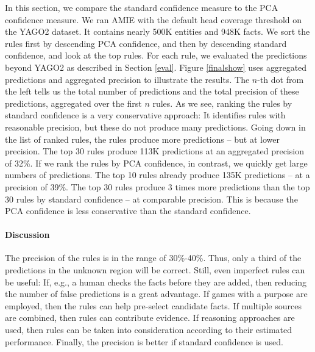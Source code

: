 In this section, we compare the standard confidence measure to the PCA confidence measure. 
We ran AMIE with the default head coverage threshold on the YAGO2 dataset. It contains nearly 500K entities and 948K facts. 
We sort the rules first by descending PCA confidence, and then by descending standard confidence, and look at the top rules.
For each rule, we evaluated the predictions beyond YAGO2 as described in Section \ref{eval}. 
Figure \ref{finalshow} uses aggregated predictions and aggregated precision to illustrate the results. 
The $n$-th dot from the left tells us the total number of predictions and the total precision of these predictions, aggregated over the first $n$ rules.
As we see, ranking the rules by standard confidence is a very conservative approach: 
It identifies rules with reasonable precision, but these do not produce many predictions. 
Going down in the list of ranked rules, the rules produce more predictions -- but at lower precision. The top 30 rules produce 113K predictions at an aggregated precision of 32\%.
If we rank the rules by PCA confidence, in contrast, we quickly get large numbers of predictions. The top 10 rules already produce 135K predictions -- at a precision of 39\%.
The top 30 rules produce 3 times more predictions than the top 30 rules by standard confidence -- at comparable precision.
This is because the PCA confidence is less conservative than the standard confidence. 



\paragraph{Discussion} The precision of the rules is in the range of 30\%-40\%. 
Thus, only a third of the predictions in the unknown region will be correct. Still, even imperfect rules can be useful: 
If, e.g., a human checks the facts before they are added, then reducing the number of false predictions is a great advantage. 
If games with a purpose are employed, then the rules can help pre-select candidate facts. If multiple sources are combined, then rules can contribute evidence. 
If reasoning approaches are used, then rules can be taken into consideration according to their estimated performance. Finally, the precision is better if 
standard confidence is used. %

